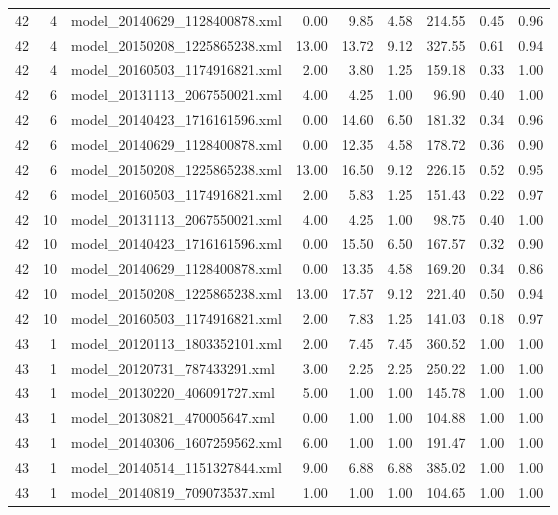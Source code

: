 \begin{table}[ht]
\begin{tabular}{rrlrrrrrr}
   42 &   4 & model\_20140629\_1128400878.xml & 0.00 & 9.85 & 4.58 & 214.55 & 0.45 & 0.96 \\ 
   42 &   4 & model\_20150208\_1225865238.xml & 13.00 & 13.72 & 9.12 & 327.55 & 0.61 & 0.94 \\ 
   42 &   4 & model\_20160503\_1174916821.xml & 2.00 & 3.80 & 1.25 & 159.18 & 0.33 & 1.00 \\ 
   42 &   6 & model\_20131113\_2067550021.xml & 4.00 & 4.25 & 1.00 & 96.90 & 0.40 & 1.00 \\ 
   42 &   6 & model\_20140423\_1716161596.xml & 0.00 & 14.60 & 6.50 & 181.32 & 0.34 & 0.96 \\ 
   42 &   6 & model\_20140629\_1128400878.xml & 0.00 & 12.35 & 4.58 & 178.72 & 0.36 & 0.90 \\ 
   42 &   6 & model\_20150208\_1225865238.xml & 13.00 & 16.50 & 9.12 & 226.15 & 0.52 & 0.95 \\ 
   42 &   6 & model\_20160503\_1174916821.xml & 2.00 & 5.83 & 1.25 & 151.43 & 0.22 & 0.97 \\ 
   42 &  10 & model\_20131113\_2067550021.xml & 4.00 & 4.25 & 1.00 & 98.75 & 0.40 & 1.00 \\ 
   42 &  10 & model\_20140423\_1716161596.xml & 0.00 & 15.50 & 6.50 & 167.57 & 0.32 & 0.90 \\ 
   42 &  10 & model\_20140629\_1128400878.xml & 0.00 & 13.35 & 4.58 & 169.20 & 0.34 & 0.86 \\ 
   42 &  10 & model\_20150208\_1225865238.xml & 13.00 & 17.57 & 9.12 & 221.40 & 0.50 & 0.94 \\ 
   42 &  10 & model\_20160503\_1174916821.xml & 2.00 & 7.83 & 1.25 & 141.03 & 0.18 & 0.97 \\ 
   43 &   1 & model\_20120113\_1803352101.xml & 2.00 & 7.45 & 7.45 & 360.52 & 1.00 & 1.00 \\ 
   43 &   1 & model\_20120731\_787433291.xml & 3.00 & 2.25 & 2.25 & 250.22 & 1.00 & 1.00 \\ 
   43 &   1 & model\_20130220\_406091727.xml & 5.00 & 1.00 & 1.00 & 145.78 & 1.00 & 1.00 \\ 
   43 &   1 & model\_20130821\_470005647.xml & 0.00 & 1.00 & 1.00 & 104.88 & 1.00 & 1.00 \\ 
   43 &   1 & model\_20140306\_1607259562.xml & 6.00 & 1.00 & 1.00 & 191.47 & 1.00 & 1.00 \\ 
   43 &   1 & model\_20140514\_1151327844.xml & 9.00 & 6.88 & 6.88 & 385.02 & 1.00 & 1.00 \\ 
   43 &   1 & model\_20140819\_709073537.xml & 1.00 & 1.00 & 1.00 & 104.65 & 1.00 & 1.00 \\ 

\end{tabular}
\end{table}
